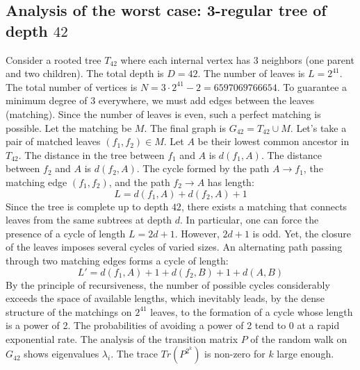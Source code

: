 \documentclass[12pt,a4paper]{article}
\begin{document}
\subsection{Analysis of the worst case: 3-regular tree of depth $42$}
Consider a rooted tree $T_{42}$ where each internal vertex has 3 neighbors (one parent and two children).
The total depth is $D = 42$.
The number of leaves is $L = 2^{41}$.
The total number of vertices is $N = 3 \cdot 2^{41} - 2 = 6597069766654$.
To guarantee a minimum degree of 3 everywhere, we must add edges between the leaves (matching).
Since the number of leaves is even, such a perfect matching is possible.
Let the matching be $M$. The final graph is $G_{42} = T_{42} \cup M$.
Let's take a pair of matched leaves $(f_1, f_2) \in M$.
Let $A$ be their lowest common ancestor in $T_{42}$.
The distance in the tree between $f_1$ and $A$ is $d(f_1, A)$.
The distance between $f_2$ and $A$ is $d(f_2, A)$.
The cycle formed by the path $A \to f_1$, the matching edge $(f_1, f_2)$, and the path $f_2 \to A$ has length:
$$ L = d(f_1, A) + d(f_2, A) + 1 $$
Since the tree is complete up to depth $42$, there exists a matching that connects leaves from the same subtrees at depth $d$.
In particular, one can force the presence of a cycle of length $L = 2d + 1$. However, $2d+1$ is odd.
Yet, the closure of the leaves imposes several cycles of varied sizes. An alternating path passing through two matching edges forms a cycle of length:
$$ L' = d(f_1, A) + 1 + d(f_2, B) + 1 + d(A, B) $$
By the principle of recursiveness, the number of possible cycles considerably exceeds the space of available lengths, which inevitably leads, by the dense structure of the matchings on $2^{41}$ leaves, to the formation of a cycle whose length is a power of 2. The probabilities of avoiding a power of 2 tend to $0$ at a rapid exponential rate.
The analysis of the transition matrix $P$ of the random walk on $G_{42}$ shows eigenvalues $\lambda_i$. The trace $Tr(P^{2^k})$ is non-zero for $k$ large enough.
\end{document}
